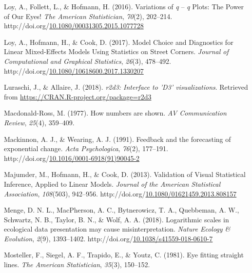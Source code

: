 \documentclass[print]{nuthesis}
\newlength{\cslhangindent}
\newenvironment{CSLReferences}%
{\setlength{\parindent}{0pt}%
\everypar{\setlength{\hangindent}{\cslhangindent}}\ignorespaces}%
{\par}
\begin{document}
\begin{CSLReferences}{1}{0}
\leavevmode{}%
Loy, A., Follett, L., \& Hofmann, H. (2016). Variations of \emph{q} -- \emph{q} {Plots}: {The} {Power} of {Our} {Eyes}! \emph{The American Statistician}, \emph{70}(2), 202--214. http://doi.org/\href{https://doi.org/10.1080/00031305.2015.1077728}{10.1080/00031305.2015.1077728}

\leavevmode{}%
Loy, A., Hofmann, H., \& Cook, D. (2017). Model {Choice} and {Diagnostics} for {Linear} {Mixed}-{Effects} {Models} {Using} {Statistics} on {Street} {Corners}. \emph{Journal of Computational and Graphical Statistics}, \emph{26}(3), 478--492. http://doi.org/\href{https://doi.org/10.1080/10618600.2017.1330207}{10.1080/10618600.2017.1330207}

\leavevmode{}%
Luraschi, J., \& Allaire, J. (2018). \emph{r2d3: Interface to 'D3' visualizations}. Retrieved from \url{https://CRAN.R-project.org/package=r2d3}

\leavevmode{}%
Macdonald-Ross, M. (1977). How numbers are shown. \emph{AV Communication Review}, \emph{25}(4), 359--409.

\leavevmode{}%
Mackinnon, A. J., \& Wearing, A. J. (1991). Feedback and the forecasting of exponential change. \emph{Acta Psychologica}, \emph{76}(2), 177--191. http://doi.org/\href{https://doi.org/10.1016/0001-6918(91)90045-2}{10.1016/0001-6918(91)90045-2}

\leavevmode{}%
Majumder, M., Hofmann, H., \& Cook, D. (2013). Validation of {Visual} {Statistical} {Inference}, {Applied} to {Linear} {Models}. \emph{Journal of the American Statistical Association}, \emph{108}(503), 942--956. http://doi.org/\href{https://doi.org/10.1080/01621459.2013.808157}{10.1080/01621459.2013.808157}

\leavevmode{}%
Menge, D. N. L., MacPherson, A. C., Bytnerowicz, T. A., Quebbeman, A. W., Schwartz, N. B., Taylor, B. N., \& Wolf, A. A. (2018). Logarithmic scales in ecological data presentation may cause misinterpretation. \emph{Nature Ecology \& Evolution}, \emph{2}(9), 1393--1402. http://doi.org/\href{https://doi.org/10.1038/s41559-018-0610-7}{10.1038/s41559-018-0610-7}

\leavevmode{}%
Mosteller, F., Siegel, A. F., Trapido, E., \& Youtz, C. (1981). Eye fitting straight lines. \emph{The American Statistician}, \emph{35}(3), 150--152.


\end{CSLReferences}
\end{document}
